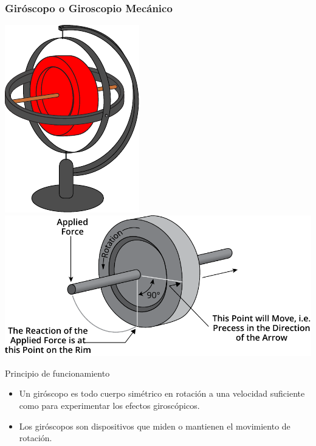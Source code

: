 \begin{frame}
    \frametitle{Giróscopo o Giroscopio Mecánico}
    \scriptsize
    \begin{center}
        \hspace{1em}
        \includegraphics[width=0.15\columnwidth]{images/gyroscope.pdf}
        \hspace{1em}
        \includegraphics[width=0.4\columnwidth]{images/gyroscope_precession.pdf}
    \end{center}

    \begin{block}{Principio de funcionamiento}
        \begin{itemize}
            \item Un giróscopo es todo cuerpo simétrico en rotación a una velocidad suficiente como para experimentar los efectos giroscópicos.
            \item Los giróscopos son dispositivos que miden o mantienen el movimiento de rotación.
        \end{itemize}
    \end{block}
    


\end{frame}

